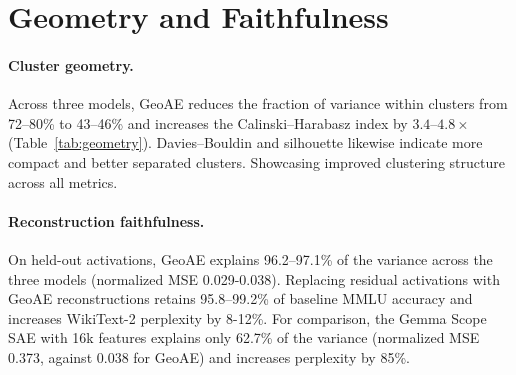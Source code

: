 \documentclass[11pt]{article}
\begin{document}


\section{Geometry and Faithfulness}
\label{sec:geometry}

\paragraph{Cluster geometry.}
Across three models, GeoAE reduces the fraction of variance
within clusters from 72--80\% to 43--46\% and increases the
Calinski--Harabasz index by $3.4$--$4.8\times$
(Table~\ref{tab:geometry}).
Davies--Bouldin and silhouette likewise indicate more compact and better separated clusters.
Showcasing improved clustering structure across all metrics.

\paragraph{Reconstruction faithfulness.}
On held-out activations, GeoAE explains 96.2--97.1\% of the variance across the three models (normalized MSE
0.029-0.038).
Replacing residual activations with GeoAE reconstructions
retains 95.8--99.2\% of baseline MMLU accuracy and increases WikiText-2 perplexity by 8-12\%.
For comparison, the Gemma Scope SAE with 16k features explains only 62.7\% of the variance
(normalized MSE 0.373, against 0.038 for GeoAE) and increases perplexity by 85\%.
\end{document}
